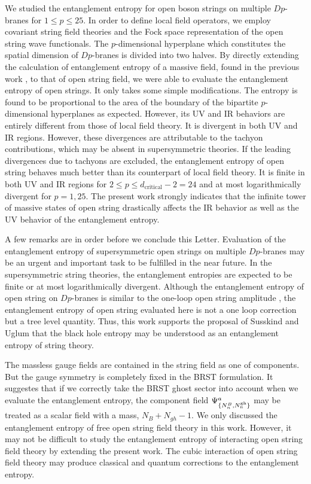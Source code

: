 \documentclass[aps,showpacs,showkeys]{revtex4}
\begin{document}
We studied the entanglement entropy for open boson strings on multiple $Dp$-branes for $1 \le p \le 25$.
In order to define local field operators, we employ covariant string field theories and the 
Fock space representation of the open string wave functionals. The $p$-dimensional hyperplane which constitutes 
the spatial dimension of $Dp$-branes is divided into two halves.     
By directly extending the calculation of entanglement entropy of a massive field, found in the 
previous work \cite{Calabrese2004}, to that of open string field, we were able to evaluate the entanglement entropy of open 
strings. It only takes some simple modifications. The entropy is found to be proportional to the 
area of the boundary of the bipartite $p$-dimensional hyperplanes as expected. However, its UV and IR behaviors are entirely
different from those of local field theory. It is divergent in both UV and IR regions. 
However, these divergences are attributable to the tachyon contributions, which may be absent in supersymmetric theories. 
If the leading divergences due to tachyons are excluded, the entanglement entropy of open string behaves much better 
than its counterpart of local field theory. It is finite in both UV and IR 
regions for 
$2 \le p \le d_{\text{critical}} -2 = 24$ 
and at most logarithmically divergent for $p=1, 25$. The present work strongly indicates 
that the infinite tower of massive states of open string drastically 
affects the IR behavior as well as the UV behavior of the entanglement entropy.  

A few remarks are in order before we conclude this Letter. Evaluation of the entanglement entropy 
of supersymmetric open strings on multiple $Dp$-branes may be an urgent and important task to be fulfilled 
in the near future. In the supersymmetric string theories, the entanglement entropies are expected to be 
finite or at most logarithmically divergent. 
Although the entanglement entropy of open string on $Dp$-branes is similar to the one-loop open string amplitude \cite{TLee2003VY},
the entanglement entropy of open string evaluated here is not a one loop correction but a tree level quantity.
Thus, this work supports the proposal of Susskind and Uglum \cite{Susskind1994U} that the black hole entropy may be understood as an entanglement entropy of string theory.
  
The massless gauge fields are contained in the string field as one of components. But the gauge symmetry is 
completely fixed in the BRST formulation. It suggestes that if we correctly take the BRST ghost 
sector into account when we evaluate the entanglement entropy, the component field $\Psi^a_{\{N^B_n, N^{\rm{gh}}_n\}}$ may be treated as a scalar field with a mass, $N_B + N_{gh}-1$. 
We only discussed the entanglement entropy of free open string field theory in this work. However, 
it may not be difficult to study the entanglement entropy of interacting open string field theory by extending 
the present work. The cubic interaction of open string field theory may produce classical and quantum corrections to the entanglement entropy.   
\end{document}
